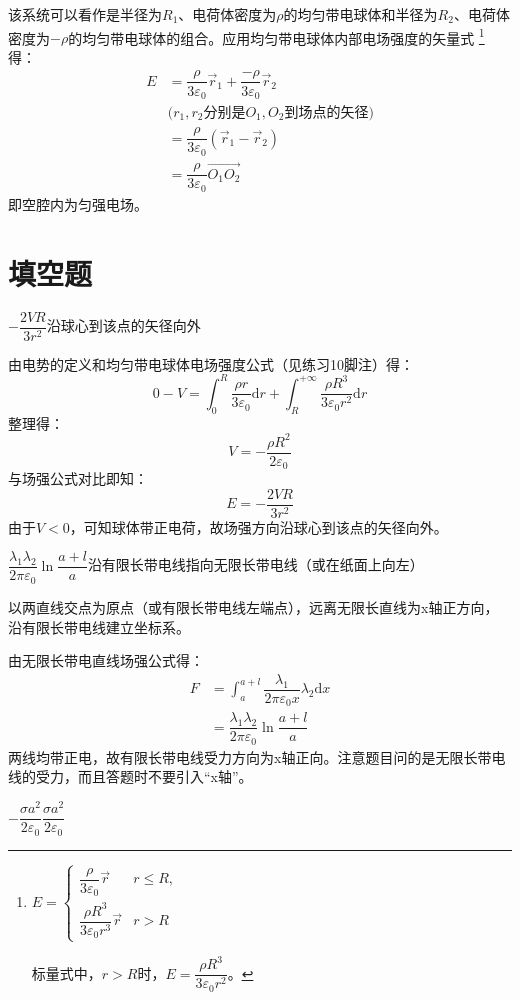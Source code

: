 \documentclass[b5paper,opensource,sourcefont,parskip]{qyxf-book}
\newcommand{\di}[1]{\mathrm{d}#1}
\begin{document}
\solve
该系统可以看作是半径为$R_1$、电荷体密度为$\rho$的均匀带电球体和半径为$R_2$、电荷体密度为$-\rho$的均匀带电球体的组合。应用均匀带电球体内部电场强度的矢量式
\footnote{
	$E=
	\begin{cases}
	\dfrac{\rho}{3\varepsilon_0}\vec{r} & r\leqslant R,\\
	\dfrac{\rho R^3}{3\varepsilon_0 r^3}\vec{r} & r > R
	\end{cases}$

	标量式中，$r>R$时，$E=\dfrac{\rho R^3}{3\varepsilon_0 r^2}$。
}得：
\begin{align*}
	E&=\dfrac{\rho}{3\varepsilon_0}\vec{r}_1+\dfrac{-\rho}{3\varepsilon_0}\vec{r}_2\\
	&\text{($r_1,r_2$分别是$O_1,O_2$到场点的矢径)}\\
	&=\dfrac{\rho}{3\varepsilon_0}(\vec{r}_1-\vec{r}_2)\\
	&=\dfrac{\rho}{3\varepsilon_0}\overrightarrow{O_1O_2}
\end{align*}
即空腔内为匀强电场。

\section{填空题}

$-\dfrac{2VR}{3r^2}$\quad 沿球心到该点的矢径向外

\solve
由电势的定义和均匀带电球体电场强度公式（见练习10脚注）得：
\[
0-V=\int_{0}^{R}\dfrac{\rho r}{3\varepsilon_0}\di{r}+\int_{R}^{+\infty}\dfrac{\rho R^3}{3\varepsilon_0 r^2}\di{r}
\]
整理得：
\[
V=-\dfrac{\rho R^2}{2\varepsilon_0}
\]
与场强公式对比即知：
\[
E=-\dfrac{2VR}{3r^2}
\]
由于$V<0$，可知球体带正电荷，故场强方向沿球心到该点的矢径向外。

$\dfrac{\lambda_1\lambda_2}{2\pi \varepsilon_0}\ln\dfrac{a+l}{a}$\quad 沿有限长带电线指向无限长带电线（或在纸面上向左）

\solve
以两直线交点为原点（或有限长带电线左端点），远离无限长直线为x轴正方向，沿有限长带电线建立坐标系。

由无限长带电直线场强公式得：
\begin{align*}
	F&=\int_{a}^{a+l}\dfrac{\lambda_1}{2\pi \varepsilon_0 x}\lambda_2\di{x}\\
	&=\dfrac{\lambda_1\lambda_2}{2\pi \varepsilon_0}\ln\dfrac{a+l}{a}
\end{align*}
两线均带正电，故有限长带电线受力方向为x轴正向。注意题目问的是无限长带电线的受力，而且答题时不要引入“x轴”。

$-\dfrac{\sigma a^2}{2\varepsilon_0}$\quad$\dfrac{\sigma a^2}{2\varepsilon_0}$
\end{document}
